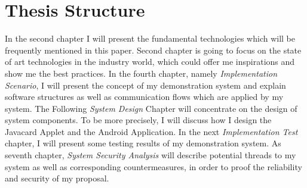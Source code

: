 \section{Thesis Structure}
In the second chapter I will present the fundamental technologies which will be frequently mentioned in this paper. Second chapter is going to focus on the state of art technologies in the industry world, which could offer me inspirations and show me the best practices. In the fourth chapter, namely \emph{Implementation Scenario}, I will present the concept of my demonstration system and explain software structures as well as communication flows which are applied by my system. The Following \emph{System Design} Chapter will concentrate on the design of system components. To be more precisely, I will discuss how I design the Javacard Applet and the Android Application. In the next \emph{Implementation Test} chapter, I will present some testing results of my demonstration system. As seventh chapter, \emph{System Security Analysis} will describe potential threads to my system as well as corresponding countermeasures, in order to proof the reliability and security of my proposal.